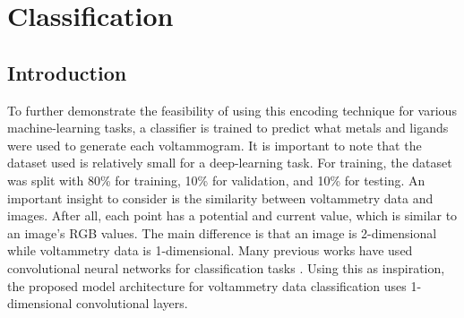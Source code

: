 \chapter{Classification} \label{chap:chap-3}




\section{Introduction}
To further demonstrate the feasibility of using this encoding technique for various machine-learning tasks, a classifier is trained to predict what metals and ligands were used to generate each voltammogram. It is important to note that the dataset used is relatively small for a deep-learning task. For training, the dataset was split with 80\% for training, 10\% for validation, and 10\% for testing.  An important insight to consider is the similarity between voltammetry data and images. After all, each point has a potential and current value, which is similar to an image's RGB values. The main difference is that an image is 2-dimensional while voltammetry data is 1-dimensional. Many previous works have used convolutional neural networks for classification tasks \cite{SHARMA2018377}. Using this as inspiration, the proposed model architecture for voltammetry data classification uses 1-dimensional convolutional layers. 
